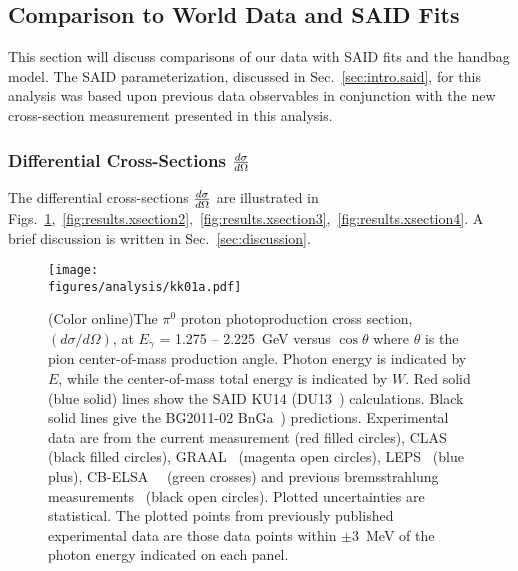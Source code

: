 \subsection{Comparison to World Data and SAID Fits}\label{sec:results.conclusion}
This section will discuss comparisons of our data with SAID fits and the  handbag model. The SAID parameterization, discussed in Sec.~\ref{sec:intro.said}, for this analysis was based upon previous data observables in conjunction with the new cross-section measurement presented in this analysis.

\subsubsection{Differential Cross-Sections $\frac{\lowercase{d}\sigma}{\lowercase{d}\Omega}$}\label{diffXsection}
The differential cross-sections $\frac{\lowercase{d}\sigma}{\lowercase{d}\Omega}$ are illustrated in Figs.~\ref{fig:results.xsection1},~\ref{fig:results.xsection2},~\ref{fig:results.xsection3},~\ref{fig:results.xsection4}. A brief discussion is written in Sec.~\ref{sec:discussion}.
\begin{figure}[h!]\begin{center}
\texttt{[image: \\figures/analysis/kk01a.pdf]}
\caption[The $\pi^0$ proton photoproduction cross section, $(d\sigma/d\Omega)$, at $E_{\gamma}$ = 1.275 -- 2.225~GeV versus $\cos\theta$ where $\theta$ is the pion center-of-mass production angle]{\label{fig:results.xsection1}(Color online)The $\pi^0$ proton photoproduction cross section, $(d\sigma/d\Omega)$, at $E_{\gamma}$ = 1.275 -- 2.225~GeV versus $\cos\theta$ where $\theta$ is the pion center-of-mass production angle. Photon energy is indicated by $E$, while the center-of-mass total energy is indicated by $W$. Red solid (blue solid) lines show the SAID KU14 (DU13~\protect\cite{Dugger13}) calculations. Black solid lines give the BG2011-02 BnGa~\protect\cite{BonnGat}) predictions. Experimental data are from the current measurement (red filled circles), CLAS~\protect\cite{Dugger07} (black filled circles), GRAAL~\protect\cite{Graal} (magenta open circles), LEPS~\protect\cite{LEPS} (blue plus), CB-ELSA~\protect\cite{ELSA05}~\cite{ELSA11} (green crosses) and previous bremsstrahlung measurements~\protect\cite{brem} (black open circles). Plotted uncertainties are statistical. The plotted points from previously published experimental data are those data points within $\pm$3~MeV of the photon energy indicated on each panel.}
\end{center}\end{figure} 

